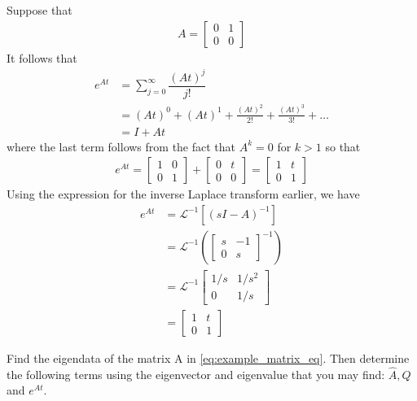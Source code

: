 \begin{example}
	Suppose that 
	\begin{align}
		A = \begin{bmatrix}
		0 & 1 \\ 0 & 0
		\end{bmatrix}
	\end{align}
	It follows that
	\begin{align}
		e^{At} &= \sum_{j=0}^{\infty} \dfrac{(At)^j}{j!} \nonumber \\
		       &= (At)^0 + (At)^1 + \frac{(At)^2}{2!} +  \frac{(At)^3}{3!} + \ldots \nonumber \\
		       &= I + At
	\end{align}	
	where the last term follows from the fact that $A^k = 0$ for $k>1$ so that 
	\begin{align}
		e^{At} = \begin{bmatrix}
		1 & 0 \\ 0 & 1
		\end{bmatrix}
		+ 
		\begin{bmatrix}
		0 & t \\ 0 & 0
		\end{bmatrix}
		= 
		\begin{bmatrix}
		1 & t \\ 0 & 1
		\end{bmatrix}
	\end{align}
	Using the expression for the inverse Laplace transform earlier, we have 
	\begin{align}
		e^{At} &= \mathcal{L}^{-1}\left[\left(sI-A\right)^{-1}\right] \nonumber \\
		&= \mathcal{L}^{-1}\left(
		\begin{bmatrix}
		s & -1 \\ 0 & s
		\end{bmatrix}^{-1}\right) \nonumber \\
		&= \mathcal{L}^{-1} 
		\begin{bmatrix}
		1/s & 1/s^2 \\ 0 & 1/s
		\end{bmatrix} \nonumber \\
		&= \begin{bmatrix}
		1 & t \\ 0 & 1
		\end{bmatrix}
		\label{eq:example_matrix_eq}
	\end{align}
\end{example}

\begin{homework}
	Find the eigendata of the matrix A in \eqref{eq:example_matrix_eq}. Then determine the following terms using the eigenvector and eigenvalue that you may find:
	$\hat{A}, Q$ and $e^{At}$.
\end{homework}

